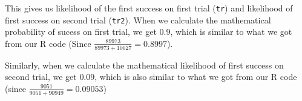 \documentclass[11pt]{article}
\begin{document}
This gives us likelihood of the first success on first trial (\texttt{tr}) and likelihood of first success on second trial (\texttt{tr2}).
When we calculate the mathematical probability of sucess on first trial, we get \(0.9\), which is similar to what we got from our R code (Since \(\frac{89973}{89973+10027}=0.8997\)).

Similarly, when we calculate the mathematical likelihood of first success on second trial, we get \(0.09\), which is also similar to what we got from our R code (since \(\frac{9051}{9051+90949}=0.09053\))
\end{document}
